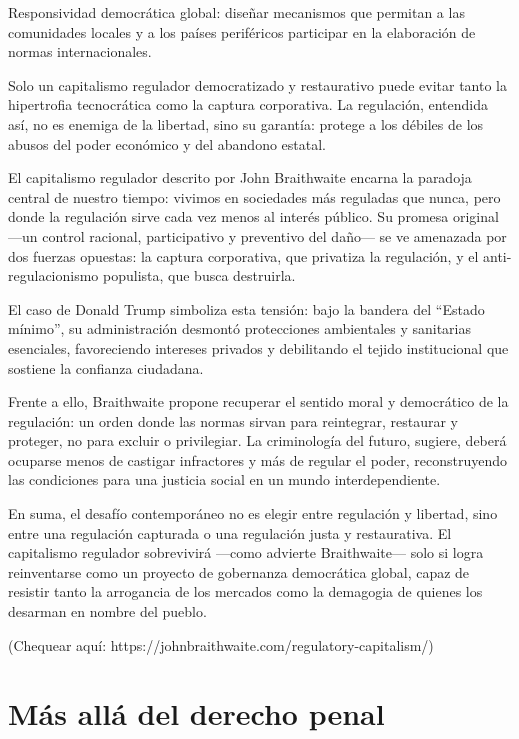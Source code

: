 \documentclass[
  spanish,
  letterpaper,
  DIV=11,
  numbers=noendperiod]{scrreprt}
\begin{document}
Responsividad democrática global: diseñar mecanismos que permitan a las
comunidades locales y a los países periféricos participar en la
elaboración de normas internacionales.

Solo un capitalismo regulador democratizado y restaurativo puede evitar
tanto la hipertrofia tecnocrática como la captura corporativa. La
regulación, entendida así, no es enemiga de la libertad, sino su
garantía: protege a los débiles de los abusos del poder económico y del
abandono estatal.

El capitalismo regulador descrito por John Braithwaite encarna la
paradoja central de nuestro tiempo: vivimos en sociedades más reguladas
que nunca, pero donde la regulación sirve cada vez menos al interés
público. Su promesa original ---un control racional, participativo y
preventivo del daño--- se ve amenazada por dos fuerzas opuestas: la
captura corporativa, que privatiza la regulación, y el
anti-regulacionismo populista, que busca destruirla.

El caso de Donald Trump simboliza esta tensión: bajo la bandera del
``Estado mínimo'', su administración desmontó protecciones ambientales y
sanitarias esenciales, favoreciendo intereses privados y debilitando el
tejido institucional que sostiene la confianza ciudadana.

Frente a ello, Braithwaite propone recuperar el sentido moral y
democrático de la regulación: un orden donde las normas sirvan para
reintegrar, restaurar y proteger, no para excluir o privilegiar. La
criminología del futuro, sugiere, deberá ocuparse menos de castigar
infractores y más de regular el poder, reconstruyendo las condiciones
para una justicia social en un mundo interdependiente.

En suma, el desafío contemporáneo no es elegir entre regulación y
libertad, sino entre una regulación capturada o una regulación justa y
restaurativa. El capitalismo regulador sobrevivirá ---como advierte
Braithwaite--- solo si logra reinventarse como un proyecto de gobernanza
democrática global, capaz de resistir tanto la arrogancia de los
mercados como la demagogia de quienes los desarman en nombre del pueblo.

(Chequear aquí: https://johnbraithwaite.com/regulatory-capitalism/)

\section{Más allá del derecho
penal}\label{muxe1s-alluxe1-del-derecho-penal}
\end{document}

